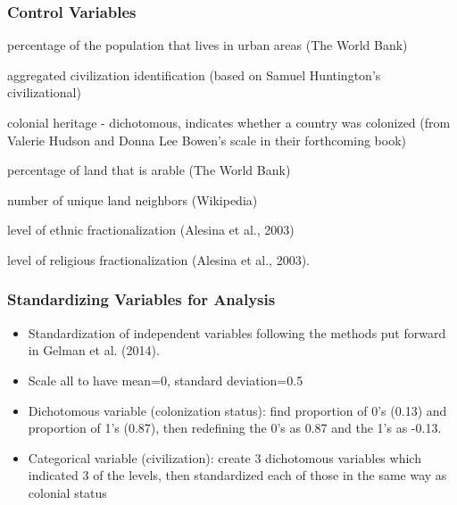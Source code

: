 \documentclass{beamer}
\begin{document}
\begin{frame}
\frametitle{Control Variables}
\itemize
\item percentage of the population that lives in urban areas (The World Bank)
\item aggregated civilization identification (based on Samuel Huntington's civilizational) \item colonial heritage - dichotomous, indicates whether a country was colonized (from Valerie Hudson and Donna Lee Bowen's scale in their forthcoming book)
\item percentage of land that is arable (The World Bank)
\item number of unique land neighbors (Wikipedia)
\item level of ethnic fractionalization (Alesina et al., 2003)
\item level of religious fractionalization (Alesina et al., 2003).
\end{frame}

\begin{frame}
\frametitle{Standardizing Variables for Analysis}
\begin{itemize}
\item Standardization of independent variables following the methods put forward in Gelman et al. (2014). 
\item Scale all to have mean=0, standard deviation=0.5
\item Dichotomous variable (colonization status): find proportion of 0's (0.13) and proportion of 1's (0.87), then redefining the 0's as 0.87 and the 1's as -0.13.
\item Categorical variable (civilization): create 3 dichotomous variables which indicated 3 of the levels, then standardized each of those in the same way as colonial status
\end{itemize}
\end{frame}
\end{document}
